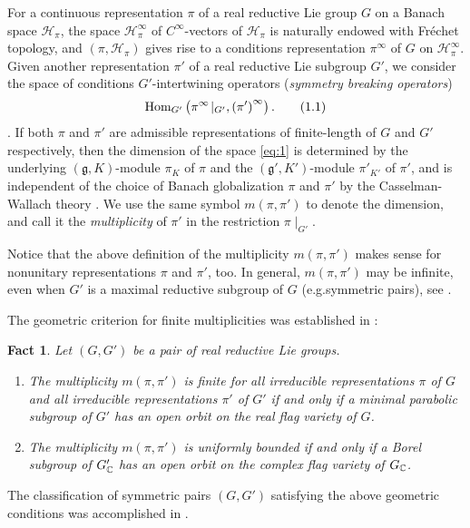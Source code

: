 \documentclass[reqno,12pt]{pja00} %
\newcommand{\Hom}{\mbox{\normalfont Hom}}
\newtheorem{fact}{Fact}[section]
\theoremstyle{definition}
\theoremstyle{exampstyle} \newtheorem{examp}[theorem]{Theorem}
\begin{document}
For a continuous representation $\pi$ of a real reductive Lie group $G$ on a Banach space $\mathcal{H}_\pi$, the space $\mathcal{H}_\pi^\infty$
of $C^\infty$-vectors of $\mathcal{H}_\pi$ is naturally endowed with Fr\'echet topology, and $(\pi,\mathcal{H}_\pi)$ gives rise to a conditions representation $\pi^\infty$
of $G$ on $\mathcal{H}_\pi^\infty$.
Given another representation $\pi'$ of a real reductive Lie subgroup $G'$, we consider the space of conditions $G'$-intertwining operators ({\it symmetry breaking operators})
\begin{equation}\label{eq:1}
	\Hom_{G'}\left( \pi^\infty\!\mid_{G'}, \left( \pi' \right)^\infty\right).\tag{1.1}
\end{equation}.
If both $\pi$ and $\pi'$ are admissible representations of finite-length of $G$ and $G'$ respectively, then the dimension of the space \eqref{eq:1} is determined by the underlying
$(\mathfrak{g},K)$-module $\pi_K$ of $\pi$ and the $(\mathfrak{g}',K')$-module $\pi'_{K'}$ of $\pi'$, and is independent of the choice of Banach globalization $\pi$ and $\pi'$ by the Casselman-Wallach theory
\cite{wallach1988real2}. We use the same symbol $m(\pi,\pi')$ to denote the dimension, and call it the {\it multiplicity} of $\pi'$ in the restriction $\pi\!\mid_{G'}$.

Notice that the above definition of the multiplicity $m(\pi,\pi')$ makes sense for nonunitary representations $\pi$ and $\pi'$, too. In general, $m(\pi,\pi')$ may be infinite, even when $G'$ is a 
maximal reductive subgroup of $G$
(e.g.\;symmetric pairs), see \cite{Kobayashi2014}.

The geometric criterion for finite multiplicities was established in \cite{kobayashi2013finite}:
\begin{fact}\label{fact:1} Let $(G,G')$ be a pair of real reductive Lie groups.
	\begin{enumerate}[(1)]
		\item The multiplicity $m(\pi,\pi')$ is finite for all irreducible representations $\pi$ of $G$ and all irreducible representations $\pi'$ of $G'$ if and only if
			a minimal parabolic subgroup of $G'$ has an open orbit on the real flag variety of $G$.
		\item The multiplicity $m(\pi,\pi')$ is uniformly bounded if and only if a Borel subgroup of $G_{\mathbb{C}}'$ has an open orbit on the complex flag variety of $G_{\mathbb{C}}$.
	\end{enumerate}
\end{fact}
The classification of symmetric pairs $(G,G')$ satisfying the above geometric conditions was accomplished in \cite{kobayashi2014classification}.
\end{document}
